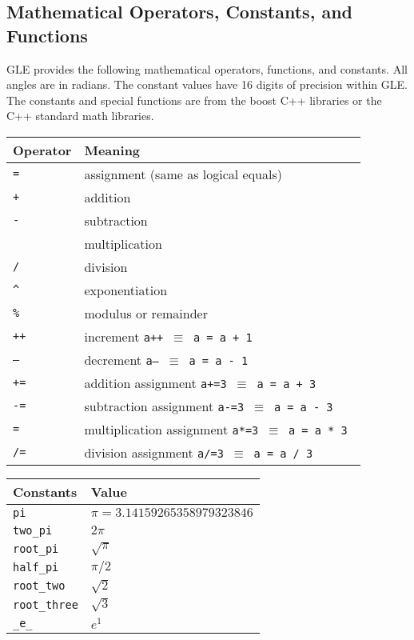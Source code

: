 \subsection{Mathematical  Operators, Constants, and Functions}

GLE provides the following mathematical operators, functions, and constants.  All angles are in radians. The constant values have 16 digits of precision within GLE.  The constants and special functions are from the boost C++ libraries or the C++ standard math libraries.

\vspace{2ex}

\begin{tabular}{ll} \hline
Operator & Meaning  \\ \hline
{\tt =} \index{=}      & assignment (same as logical equals) \\
{\tt +} \index{+}  & addition \\
{\tt -} \index{-} & subtraction \\
{\tt *} \index{*}  & multiplication\\
{\tt /} \index{/}  & division \\
{\tt \textasciicircum } \index{\textasciicircum}  & exponentiation \\
{\tt \%} \index{\%}     & modulus or remainder\\
{\tt ++} \index{++}  & increment {\tt a++ $\equiv$ a = a + 1 }\\
{\tt --} \index{--}  & decrement {\tt a-- $\equiv$ a = a - 1 }\\
{\tt +=} \index{+=}  & addition assignment  {\tt a+=3 $\equiv$ a = a + 3 }\\
{\tt -=} \index{-=}  & subtraction assignment {\tt a-=3 $\equiv$ a = a - 3 }\\
{\tt *=} \index{*=}  & multiplication assignment {\tt a*=3 $\equiv$ a = a * 3 }\\
{\tt /=} \index{/=}  & division assignment {\tt a/=3 $\equiv$ a = a / 3 }\\
\end{tabular}

\vspace{2ex}

\begin{tabular}{ll} \hline
Constants & Value  \\ \hline
{\tt pi} \index{pi}      & $\pi = 3.14159265358979323846 $ \\
{\tt two\_pi} \index{two\_pi}  & $2\pi $ \\
{\tt root\_pi} \index{root\_pi} & $\sqrt{\pi}$ \\
{\tt half\_pi} \index{half\_pi}  & $\pi/2$ \\
{\tt root\_two} \index{root\_two}  & $\sqrt{2}$ \\
{\tt root\_three} \index{root\_three}  & $\sqrt{3}$ \\
{\tt \_e\_} \index{\_e\_}     & $e^1$ \\
\end{tabular}

